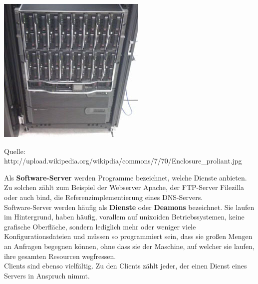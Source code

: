 \documentclass[12pt,a4paper]{report}
\begin{document}
\begin{onehalfspace}
\begin{center}
\includegraphics[scale=0.8]{../docs/tarkes/pics/ServerRack.jpg}\\
\begin{scriptsize}
Quelle: http://upload.wikipedia.org/wikipdia/commons/7/70/Enclosure\_proliant.jpg
\end{scriptsize}
\end{center}

Als \textbf{Software-Server} werden Programme bezeichnet, welche Dienste anbieten. Zu solchen zählt zum Beispiel der Webserver Apache, der FTP-Server Filezilla oder auch bind, die Referenzimplementierung eines DNS-Servers.\\
Software-Server werden häufig als \textbf{Dienste} oder \textbf{Deamons} bezeichnet. Sie laufen im Hintergrund, haben häufig, vorallem auf unixoiden Betriebssystemen, keine grafische Oberfläche, sondern lediglich mehr oder weniger viele Konfigurationsdateien und müssen so programmiert sein, dass sie großen Mengen an Anfragen begegnen können, ohne dass sie der Maschine, auf welcher sie laufen, ihre gesamten Resourcen wegfressen.\\

Clients sind ebenso vielfältig. Zu den Clients zählt jeder, der einen Dienst eines Servers in Anspruch nimmt. 

\end{onehalfspace}
\end{document}
